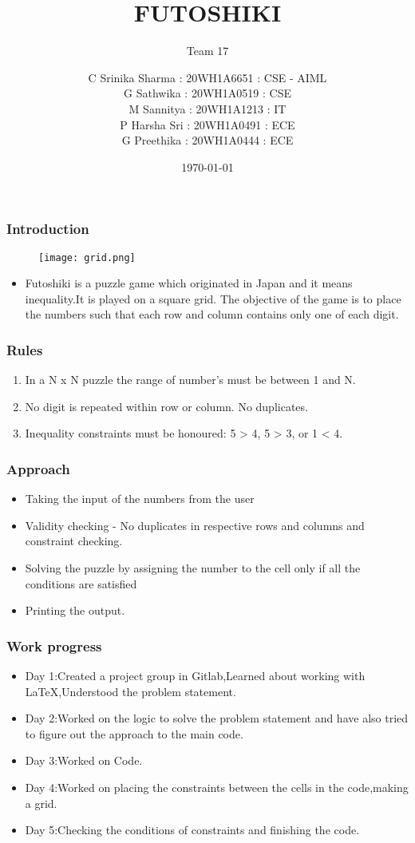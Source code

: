 \documentclass[14pt]{beamer}
\title{FUTOSHIKI}
\subtitle{Team 17}
\date{\today}
\author[Bvrith]{ C Srinika Sharma : 20WH1A6651 : CSE - AIML\\G Sathwika : 20WH1A0519 : CSE\\M Sannitya : 20WH1A1213 : IT \\P Harsha Sri : 20WH1A0491 : ECE\\G Preethika : 20WH1A0444 : ECE}
\begin{document}
   \begin{frame}
        \titlepage
    \end{frame}
   \begin{frame}
	\frametitle{Introduction}
        \begin{figure}
            \texttt{[image: grid.png]}
        \end{figure}
        \begin{itemize}
	    \item Futoshiki is a puzzle game which originated in Japan and it means inequality.It is played on a square grid. The objective of the game is to place the numbers such that each row and column contains only one of each digit.
	\end{itemize}
   \end{frame}
   \begin{frame}
	\frametitle{Rules}
         \begin{enumerate}
	    \item In a N x N puzzle the range of number's must be between 1 and N.  
	    \item No digit is repeated within row or column. No duplicates. 
	    \item Inequality constraints must be honoured: 5 > 4, 5 > 3, or 1 < 4.
	\end{enumerate}
  \end{frame}
\begin{frame}
   \frametitle{Approach}
   \begin{itemize}
       \item Taking the input of the numbers from the user
       \item Validity checking - No duplicates in respective rows and columns and constraint checking.
       \item Solving the puzzle by assigning the number to the cell only if all the conditions are satisfied
       \item Printing the output.
   \end{itemize}
\end{frame}
\begin{frame}
     \frametitle{Work progress}
     \begin{itemize}
         \item Day 1:Created a project group in Gitlab,Learned about working with LaTeX,Understood the problem statement. 
         \item Day 2:Worked on the logic to solve the problem statement and have also tried to figure out the approach to the main code.
         \item Day 3:Worked on Code.
         \item Day 4:Worked on placing the constraints between the cells in the code,making a grid.
         \item Day 5:Checking the conditions of constraints and finishing the code.
     \end{itemize}
\end{frame}
\end{document}
